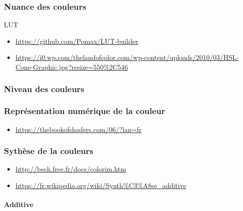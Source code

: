 \documentclass[
  french,
]{book}
\providecommand{\tightlist}{%
  \setlength{\itemsep}{0pt}\setlength{\parskip}{0pt}}
\begin{document}
\hypertarget{nuance-des-couleurs}{%
\subsubsection{Nuance des couleurs}\label{nuance-des-couleurs}}

LUT

\begin{itemize}
\item
  \url{https://github.com/Pomax/LUT-builder}
\item
  \url{https://i0.wp.com/thelandofcolor.com/wp-content/uploads/2010/03/HSL-Cone-Graphic.jpg?resize=550\%2C546}
\end{itemize}

\hypertarget{niveau-des-couleurs}{%
\subsubsection{Niveau des couleurs}\label{niveau-des-couleurs}}

\hypertarget{repruxe9sentation-numuxe9rique-de-la-couleur}{%
\subsubsection{Représentation numérique de la couleur}\label{repruxe9sentation-numuxe9rique-de-la-couleur}}

\begin{itemize}
\tightlist
\item
  \url{https://thebookofshaders.com/06/?lan=fr}
\end{itemize}

\hypertarget{sythuxe8se-de-la-couleurs}{%
\subsubsection{Sythèse de la couleurs}\label{sythuxe8se-de-la-couleurs}}

\begin{itemize}
\item
  \url{http://bech.free.fr/docs/colorim.htm}
\item
  \url{https://fr.wikipedia.org/wiki/Synth\%C3\%A8se_additive}
\end{itemize}

\hypertarget{additive}{%
\paragraph{Additive}\label{additive}}
\end{document}
